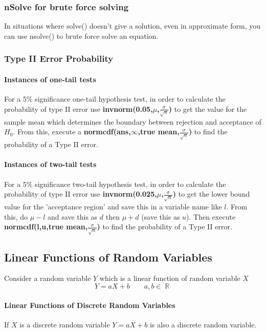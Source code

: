 \documentclass[a4paper,twoside,10pt]{article}
\DeclareMathOperator\R{\mathbb{R}}
\begin{document}
			\subsubsection{nSolve for brute force solving}
				In situations where solve() doesn't give a solution, even in approximate form, you can use nsolve() to brute force solve an equation.
				
			\subsubsection{Type II Error Probability}
				\paragraph{Instances of one-tail tests} For a 5\% significance one-tail hypothesis test, in order to calculate the probability of type II error use \textbf{invnorm(0.05,$\mu$,$\frac{\sigma}{\sqrt{n}}$)} to get the value for the sample mean which determines the boundary between rejection and acceptance of $H_0$. From this, execute a \textbf{normcdf(ans,$\infty$,true mean,$\frac{\sigma}{\sqrt{n}}$)} to find the probability of a Type II error.
				
				\paragraph{Instances of two-tail tests} For a 5\% significance two-tail hypothesis test, in order to calculate the probability of type II error use \textbf{invnorm(0.025,$\mu$,$\frac{\sigma}{\sqrt{n}}$)} to get the lower bound value for the 'acceptance region' and save this in a variable name like $l$. From this, do $\mu-l$ and save this as $d$ then $\mu+d$ (save this as $u$). Then execute \textbf{normcdf(l,u,true mean,$\frac{\sigma}{\sqrt{n}}$)} to find the probability of a Type II error.
			
			
		\subsection{Linear Functions of Random Variables}
			Consider a random variable $Y$ which is a linear function of random variable $X$
			\[
				Y=aX+b\qquad a,b\in\R
			\]
			
			\paragraph{Linear Functions of Discrete Random Variables} If $X$ is a discrete random variable $Y=aX+b$ is also a discrete random variable.
			
\end{document}
